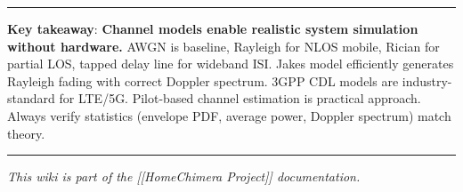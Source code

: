 \begin{center}\rule{0.5\linewidth}{0.5pt}\end{center}

\textbf{Key takeaway}: \textbf{Channel models enable realistic system
simulation without hardware.} AWGN is baseline, Rayleigh for NLOS
mobile, Rician for partial LOS, tapped delay line for wideband ISI.
Jakes\textquotesingle{} model efficiently generates Rayleigh fading with
correct Doppler spectrum. 3GPP CDL models are industry-standard for
LTE/5G. Pilot-based channel estimation is practical approach. Always
verify statistics (envelope PDF, average power, Doppler spectrum) match
theory.

\begin{center}\rule{0.5\linewidth}{0.5pt}\end{center}

\emph{This wiki is part of the {[}{[}Home\textbar Chimera Project{]}{]}
documentation.}
